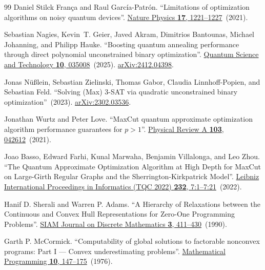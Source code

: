 \documentclass[a4paper,onecolumn,11pt,unpublished]{quantumarticle}
\theoremstyle{remark}
\begin{document}
\begin{thebibliography}{99}
Daniel Stilck França and Raul García-Patrón.
\newblock ``Limitations of optimization algorithms on noisy quantum devices''.
\newblock \href{https://doi.org/10.1038/s41567-021-01356-3}{Nature Physics {\bf 17}, 1221--1227}~(2021).


Sebastian Nagies, Kevin~T. Geier, Javed Akram, Dimitrios Bantounas, Michael Johanning, and Philipp Hauke.
\newblock ``Boosting quantum annealing performance through direct polynomial unconstrained binary optimization''.
\newblock \href{https://dx.doi.org/10.1088/2058-9565/adcae6}{Quantum Science and Technology {\bf 10}, 035008}~(2025).
\newblock \href{http://arxiv.org/abs/2412.04398}{arXiv:2412.04398}.

Jonas N{\"u}{\ss}lein, Sebastian Zielinski, Thomas Gabor, Claudia Linnhoff-Popien, and Sebastian Feld.
\newblock ``Solving (Max) 3-SAT via quadratic unconstrained binary optimization''~(2023).
\newblock \href{http://arxiv.org/abs/2302.03536}{arXiv:2302.03536}.

Jonathan Wurtz and Peter Love.
\newblock ``MaxCut quantum approximate optimization algorithm performance guarantees for $p>1$''.
\newblock \href{https://doi.org/10.1103/physreva.103.042612}{Physical Review A {\bf 103}, 042612}~(2021).


Joao Basso, Edward Farhi, Kunal Marwaha, Benjamin Villalonga, and Leo Zhou.
\newblock ``The Quantum Approximate Optimization Algorithm at High Depth for MaxCut on Large-Girth Regular Graphs and the Sherrington-Kirkpatrick Model''.
\newblock \href{https://doi.org/10.4230/lipics.tqc.2022.7}{Leibniz International Proceedings in Informatics (TQC 2022) {\bf 232}, 7:1--7:21}~(2022).


Hanif D. Sherali and Warren P. Adams.
\newblock ``A Hierarchy of Relaxations between the Continuous and Convex Hull Representations for Zero-One Programming Problems''.
\newblock \href{https://doi.org/10.1137/0403036}{SIAM Journal on Discrete Mathematics {\bf 3}, 411--430}~(1990).


Garth P. McCormick.
\newblock ``Computability of global solutions to factorable nonconvex programs: Part I --- Convex underestimating problems''.
\newblock \href{https://doi.org/10.1007/bf01580665}{Mathematical Programming {\bf 10}, 147--175}~(1976).

\end{thebibliography}
\endgroup
\end{document}
